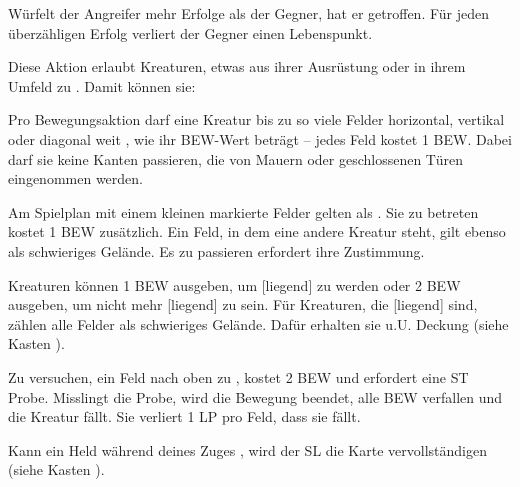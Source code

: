 {			Würfelt der Angreifer mehr Erfolge als der Gegner, hat er getroffen. Für jeden überzähligen Erfolg verliert der Gegner einen Lebenspunkt.

			Diese Aktion erlaubt Kreaturen, etwas aus ihrer Ausrüstung oder in ihrem Umfeld zu . Damit können sie:



			Pro Bewegungsaktion darf eine Kreatur bis zu so viele Felder horizontal, vertikal oder diagonal weit , wie ihr BEW-Wert beträgt -- jedes Feld kostet 1 BEW. Dabei darf sie keine Kanten passieren, die von Mauern oder geschlossenen Türen eingenommen werden.

			Am Spielplan mit einem kleinen  markierte Felder gelten als . Sie zu betreten kostet 1 BEW zusätzlich. Ein Feld, in dem eine andere Kreatur steht, gilt ebenso als schwieriges Gelände. Es zu passieren erfordert ihre Zustimmung.

			Kreaturen können 1 BEW ausgeben, um [liegend] zu werden oder 2 BEW ausgeben, um nicht mehr [liegend] zu sein. Für Kreaturen, die [liegend] sind, zählen alle Felder als schwieriges Gelände. Dafür erhalten sie u.U. Deckung (siehe Kasten ).

			Zu versuchen, ein Feld nach oben zu , kostet 2 BEW und erfordert eine ST Probe. Misslingt die Probe, wird die Bewegung beendet, alle BEW verfallen und die Kreatur fällt. Sie verliert 1 LP pro Feld, dass sie fällt.

			Kann ein Held während deines Zuges , wird der SL die Karte vervollständigen (siehe Kasten ).

}
